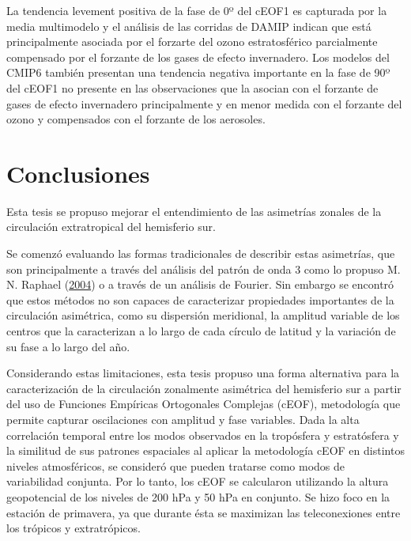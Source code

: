 \documentclass[12pt,oneside,a4paper]{reedthesis}
\begin{document}
La tendencia levement positiva de la fase de 0º del cEOF1 es capturada por la media multimodelo y el análisis de las corridas de DAMIP indican que está principalmente asociada por el forzarte del ozono estratosférico parcialmente compensado por el forzante de los gases de efecto invernadero.
Los modelos del CMIP6 también presentan una tendencia negativa importante en la fase de 90º del cEOF1 no presente en las observaciones que la asocian con el forzante de gases de efecto invernadero principalmente y en menor medida con el forzante del ozono y compensados con el forzante de los aerosoles.

\hypertarget{conclusiones}{%
\chapter{Conclusiones}\label{conclusiones}}

Esta tesis se propuso mejorar el entendimiento de las asimetrías zonales de la circulación extratropical del hemisferio sur.

Se comenzó evaluando las formas tradicionales de describir estas asimetrías, que son principalmente a través del análisis del patrón de onda 3 como lo propuso M. N. Raphael (\protect\hyperlink{ref-raphael2004}{2004}) o a través de un análisis de Fourier.
Sin embargo se encontró que estos métodos no son capaces de caracterizar propiedades importantes de la circulación asimétrica, como su dispersión meridional, la amplitud variable de los centros que la caracterizan a lo largo de cada círculo de latitud y la variación de su fase a lo largo del año.

Considerando estas limitaciones, esta tesis propuso una forma alternativa para la caracterización de la circulación zonalmente asimétrica del hemisferio sur a partir del uso de Funciones Empíricas Ortogonales Complejas (cEOF), metodología que permite capturar oscilaciones con amplitud y fase variables.
Dada la alta correlación temporal entre los modos observados en la tropósfera y estratósfera y la similitud de sus patrones espaciales al aplicar la metodología cEOF en distintos niveles atmosféricos, se consideró que pueden tratarse como modos de variabilidad conjunta.
Por lo tanto, los cEOF se calcularon utilizando la altura geopotencial de los niveles de 200 hPa y 50 hPa en conjunto.
Se hizo foco en la estación de primavera, ya que durante ésta se maximizan las teleconexiones entre los trópicos y extratrópicos.
\end{document}
